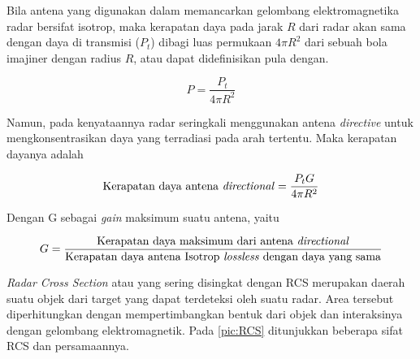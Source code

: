 Bila antena yang digunakan dalam memancarkan gelombang elektromagnetika radar bersifat isotrop, maka kerapatan daya pada jarak $R$ dari radar akan sama dengan daya di transmisi ($P_{t}$) dibagi luas permukaan $4\pi R^{2}$ dari sebuah bola imajiner dengan radius $R$, atau dapat didefinisikan pula dengan.

\begin{equation}
	P = \frac{P_{t}}{4\pi R^{2}}
\end{equation}

Namun, pada kenyataannya radar seringkali menggunakan antena \textit{directive} untuk mengkonsentrasikan daya yang terradiasi pada arah tertentu. Maka kerapatan dayanya adalah

\begin{equation}
	\text{Kerapatan daya antena \textit{directional}} = \frac{P_{t} G}{4\pi R^{2}}
\end{equation}

Dengan G sebagai \textit{gain} maksimum suatu antena, yaitu

\begin{equation}
	G  = \frac{\text{Kerapatan daya maksimum dari antena \textit{directional}}}{\text{Kerapatan daya antena Isotrop \textit{lossless} dengan daya yang sama}}
\end{equation}

\textit{Radar Cross Section} atau yang sering disingkat dengan RCS merupakan daerah suatu objek dari target yang dapat terdeteksi oleh suatu radar. Area tersebut diperhitungkan dengan mempertimbangkan bentuk dari objek dan interaksinya dengan gelombang elektromagnetik. Pada \ref{pic:RCS} ditunjukkan beberapa sifat RCS dan persamaannya.

